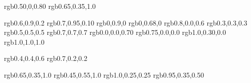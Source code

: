 

\usepackage{color}
\usepackage{xcolor}
\definecolor{darkpurple}  {rgb}{0.50,0,0.80}      %
\definecolor{purple}      {rgb}{0.65,0.35,1.0}    %

\definecolor{spring}    {rgb}{0.6,0.9,0.2}    %
\definecolor{lime}      {rgb}{0.7,0.95,0.10}  %
\definecolor{fluorescentgreen}   {rgb}{0,0.9,0}        %
\definecolor{green}     {rgb}{0,0.68,0}       %
\definecolor{magenta}   {rgb}{0.8,0.0,0.6}    %
\definecolor{dgrey}     {rgb}{0.3,0.3,0.3}    %
\definecolor{grey}      {rgb}{0.5,0.5,0.5}    %
\definecolor{lgrey}     {rgb}{0.7,0.7,0.7}    %
\definecolor{darkblue}  {rgb}{0.0,0.0,0.70}   %
\definecolor{darkred}   {rgb}{0.75,0.0,0.0}   %
\definecolor{orangered} {rgb}{1.0,0.30,0.0}   %
\definecolor{white}     {rgb}{1.0,1.0,1.0}




\definecolor{oldcolor}   {rgb}{0.4,0.4,0.6}  %
\definecolor{usedcolor}  {rgb}{0.7,0.2,0.2}  %

\definecolor{jb}             {rgb}{0.65,0.35,1.0}   %
\definecolor{jbn}            {rgb}{0.45,0.55,1.0}   %
%
\definecolor{gg}             {rgb}{1.0,0.25,0.25}     %
%
\definecolor{gs}             {rgb}{0.95,0.35,0.50}   %


